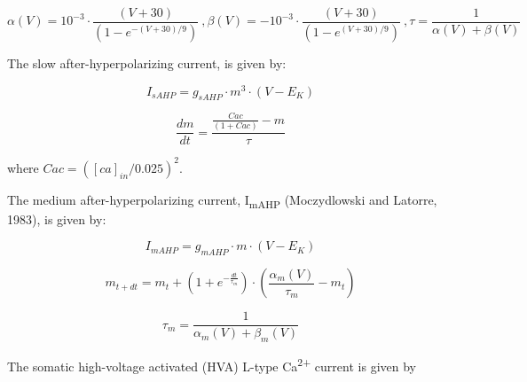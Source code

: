 \documentclass[a4paper]{article}
\begin{document}
\begin{equation}
α(V) = 10^{-3}\cdot \frac{(V+30)}{(1-e^{-(V+30)/9})} \ ,         β(V) = -10^{-3}\cdot \frac{(V+30)}{(1-e^{(V+30)/9})} \ , 
τ=\frac 1{α(V)+β(V)}
\end{equation}


The slow after-hyperpolarizing current, is given by:


\begin{equation}
I_{sAHP}= g_{sAHP}\cdot m^3\cdot
(V-E_K)
\end{equation}

\begin{equation}
\frac{dm}{dt}=\frac{\frac{Cac}{(1+Cac)}-m}{τ}
\end{equation}


where 
$Cac=([ca]_{in}/0.025)^2$.



The medium after-hyperpolarizing current, I\textsubscript{mAHP} (Moczydlowski and Latorre, 1983), is given by:


\begin{equation}
I_{mAHP}= g_{mAHP}\cdot m\cdot
(V-E_K)
\end{equation}

\begin{equation}
m_{t+dt}=m_t+(1+e^{-\frac{dt}{τ_m}})\cdot (\frac{α_m(V)}{τ_m}-m_t)
\end{equation}



\begin{equation}
τ_m=\frac {1}{α_m(V)+β_m(V)}
\end{equation}

The somatic high-voltage activated (HVA) L-type Ca\textsuperscript{2+} current is given by
\end{document}
